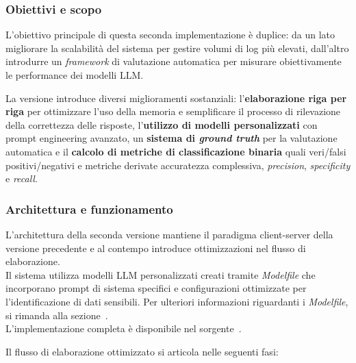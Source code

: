 \documentclass[12pt,twoside]{report}
\begin{document}
\subsubsection{Obiettivi e scopo}
\label{subsubsec:ver2_obiettivi}

L'obiettivo principale di questa seconda implementazione è duplice: da un lato migliorare la scalabilità del sistema per gestire volumi di log più elevati, dall'altro introdurre un \textit{framework} di valutazione automatica per misurare obiettivamente le performance dei modelli LLM.

La versione introduce diversi miglioramenti sostanziali: l'\textbf{elaborazione riga per riga} per ottimizzare l'uso della memoria e semplificare il processo di rilevazione della correttezza delle risposte, l'\textbf{utilizzo di modelli personalizzati} con prompt engineering avanzato, un \textbf{sistema di \textit{ground truth}} per la valutazione automatica e il \textbf{calcolo di metriche di classificazione binaria} quali veri/falsi positivi/negativi e metriche derivate accuratezza complessiva, \textit{precision}, \textit{specificity} e \textit{recall}.

\subsubsection{Architettura e funzionamento}
\label{subsubsec:ver2_architettura}

L'architettura della seconda versione mantiene il paradigma client-server della versione precedente e al contempo introduce ottimizzazioni nel flusso di elaborazione.\\
Il sistema utilizza modelli LLM personalizzati creati tramite \textit{Modelfile} che incorporano prompt di sistema specifici e configurazioni ottimizzate per l'identificazione di dati sensibili. Per ulteriori informazioni riguardanti i \textit{Modelfile}, si rimanda alla sezione~.\\
L'implementazione completa è disponibile nel sorgente~.

Il flusso di elaborazione ottimizzato si articola nelle seguenti fasi:
\end{document}
